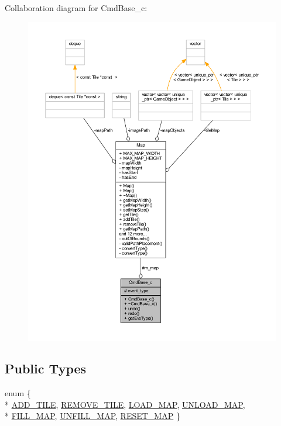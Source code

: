 Collaboration diagram for Cmd\+Base\+\_\+c\+:
\nopagebreak
\begin{figure}[H]
\begin{center}
\leavevmode
\includegraphics[width=350pt]{class_cmd_base__c__coll__graph}
\end{center}
\end{figure}
\subsection*{Public Types}
\begin{DoxyCompactItemize}
\item 
enum \{ \\*
\hyperlink{class_cmd_base__c_af28adb77d1dc7716af08a63b40457889ab9e27df11c718d9e4486b0c578c6391e}{A\+D\+D\+\_\+\+T\+I\+L\+E}, 
\hyperlink{class_cmd_base__c_af28adb77d1dc7716af08a63b40457889aee12e4ac9ace8bb24ea3f2a709c1babd}{R\+E\+M\+O\+V\+E\+\_\+\+T\+I\+L\+E}, 
\hyperlink{class_cmd_base__c_af28adb77d1dc7716af08a63b40457889a7a8c2602fa5efda43ecde5bbfe76dd3c}{L\+O\+A\+D\+\_\+\+M\+A\+P}, 
\hyperlink{class_cmd_base__c_af28adb77d1dc7716af08a63b40457889a2289030417d1bf93a2124a768ec98ef8}{U\+N\+L\+O\+A\+D\+\_\+\+M\+A\+P}, 
\\*
\hyperlink{class_cmd_base__c_af28adb77d1dc7716af08a63b40457889a1ec9788e8f8abac37b35e5dbf191fd9b}{F\+I\+L\+L\+\_\+\+M\+A\+P}, 
\hyperlink{class_cmd_base__c_af28adb77d1dc7716af08a63b40457889a4281fb7c02d3a6ccc11d17a6dde0af7c}{U\+N\+F\+I\+L\+L\+\_\+\+M\+A\+P}, 
\hyperlink{class_cmd_base__c_af28adb77d1dc7716af08a63b40457889a5f227000bcb4fea713b6f37dc276e991}{R\+E\+S\+E\+T\+\_\+\+M\+A\+P}
 \}
\end{DoxyCompactItemize}
